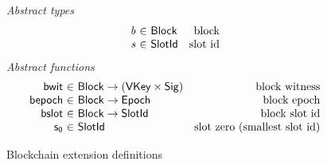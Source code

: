 \begin{figure}
  \emph{Abstract types}
  \begin{equation*}
    \begin{array}{r@{~\in~}lr}
      \var{b} & \Block & \text{block}\\
      \var{s} & \SlotId & \text{slot id}\\
    \end{array}
  \end{equation*}
  \emph{Abstract functions}
  \begin{equation*}
    \begin{array}{r@{~\in~}lr}
    \fun{bwit} & \Block \to (\VKey \times \Sig) & \text{block witness}\\
      \fun{bepoch} & \Block \to \Epoch & \text{block epoch}\\
      \fun{bslot} & \Block \to \SlotId & \text{block slot id}\\
    \fun{s_0} & \SlotId  & \text{slot zero (smallest slot id)}\\
    \end{array}
  \end{equation*}
  \caption{Blockchain extension definitions}
  \label{fig:defs:chain-extension}
\end{figure}

